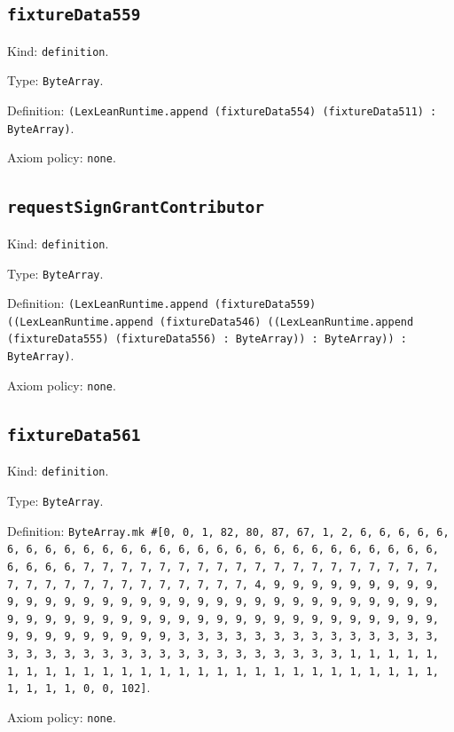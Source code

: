 \documentclass[11pt]{article}
\begin{document}
\subsection*{\texttt{fixtureData559}}
\noindent Kind: \texttt{definition}.\par
\noindent Type: \texttt{ByteArray}.\par
\noindent Definition: \texttt{(LexLeanRuntime.append (fixtureData554) (fixtureData511) : ByteArray)}.\par
\noindent Axiom policy: \texttt{none}.\par
\subsection*{\texttt{requestSignGrantContributor}}
\noindent Kind: \texttt{definition}.\par
\noindent Type: \texttt{ByteArray}.\par
\noindent Definition: \texttt{(LexLeanRuntime.append (fixtureData559) ((LexLeanRuntime.append (fixtureData546) ((LexLeanRuntime.append (fixtureData555) (fixtureData556) : ByteArray)) : ByteArray)) : ByteArray)}.\par
\noindent Axiom policy: \texttt{none}.\par
\subsection*{\texttt{fixtureData561}}
\noindent Kind: \texttt{definition}.\par
\noindent Type: \texttt{ByteArray}.\par
\noindent Definition: \texttt{ByteArray.mk \#[0, 0, 1, 82, 80, 87, 67, 1, 2, 6, 6, 6, 6, 6, 6, 6, 6, 6, 6, 6, 6, 6, 6, 6, 6, 6, 6, 6, 6, 6, 6, 6, 6, 6, 6, 6, 6, 6, 6, 6, 6, 7, 7, 7, 7, 7, 7, 7, 7, 7, 7, 7, 7, 7, 7, 7, 7, 7, 7, 7, 7, 7, 7, 7, 7, 7, 7, 7, 7, 7, 7, 7, 7, 4, 9, 9, 9, 9, 9, 9, 9, 9, 9, 9, 9, 9, 9, 9, 9, 9, 9, 9, 9, 9, 9, 9, 9, 9, 9, 9, 9, 9, 9, 9, 9, 9, 9, 9, 9, 9, 9, 9, 9, 9, 9, 9, 9, 9, 9, 9, 9, 9, 9, 9, 9, 9, 9, 9, 9, 9, 9, 9, 9, 9, 9, 9, 9, 9, 3, 3, 3, 3, 3, 3, 3, 3, 3, 3, 3, 3, 3, 3, 3, 3, 3, 3, 3, 3, 3, 3, 3, 3, 3, 3, 3, 3, 3, 3, 3, 3, 1, 1, 1, 1, 1, 1, 1, 1, 1, 1, 1, 1, 1, 1, 1, 1, 1, 1, 1, 1, 1, 1, 1, 1, 1, 1, 1, 1, 1, 1, 1, 1, 0, 0, 102]}.\par
\noindent Axiom policy: \texttt{none}.\par
\end{document}
